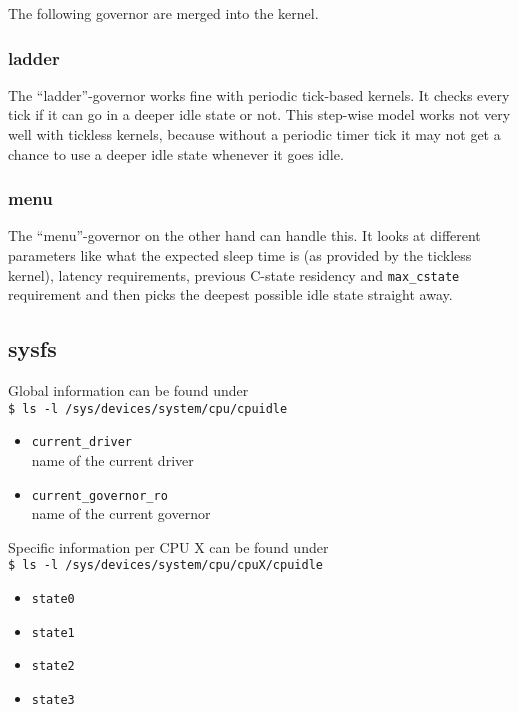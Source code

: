 The following governor are merged into the kernel.

\subsubsection{ladder}
The ``ladder''-governor works ﬁne with periodic tick-based kernels. It checks every tick if it can go in a deeper idle state or not. This step-wise model works not very well with tickless kernels, because without a periodic timer tick it may not get a chance to use a deeper idle state whenever it goes idle.

\subsubsection{menu}
The ``menu''-governor on the other hand can handle this. It looks at different parameters like what the expected sleep time is (as provided by the tickless kernel), latency requirements, previous C-state residency and \lstinline!max_cstate! requirement and then picks the deepest possible idle state straight away.

%
\subsection{sysfs}
Global information can be found under\\[1em]
%
\noindent
\lstinline!$ ls -l /sys/devices/system/cpu/cpuidle!
\begin{multicols}{2}
\begin{itemize}
\renewcommand{\labelitemi}{\drsh}
\item \lstinline!current_driver!\\
	name of the current driver
\item \lstinline!current_governor_ro!\\
	name of the current governor
\end{itemize}
\end{multicols}
%

\noindent
Specific information per CPU X can be found under\\[1em]
%
\noindent
\lstinline!$ ls -l /sys/devices/system/cpu/cpuX/cpuidle!
%
\begin{multicols}{2}
\begin{itemize}
\renewcommand{\labelitemi}{\drsh}
\item \lstinline!state0!
\item \lstinline!state1!
\item \lstinline!state2!
\item \lstinline!state3!
\end{itemize}
\end{multicols}
%

